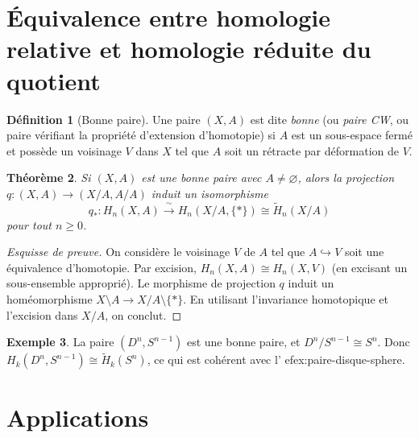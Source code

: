 \documentclass[12pt,a4paper,openany]{book}
\theoremstyle{definition}
\newtheorem{definition}{Définition}[chapter]
\newtheorem{exemple}[definition]{Exemple}
\theoremstyle{plain}
\newtheorem{theoreme}[definition]{Théorème}
\theoremstyle{remark}
\begin{document}
\section{Équivalence entre homologie relative et homologie réduite du quotient}\label{sec:equiv-relative-quotient}

\begin{definition}[Bonne paire]\label{def:bonne-paire}
Une paire $(X, A)$ est dite \emph{bonne} (ou \emph{paire CW}, ou paire vérifiant la
propriété d'extension d'homotopie) si $A$ est un sous-espace fermé et possède un
voisinage $V$ dans $X$ tel que $A$ soit un rétracte par déformation de $V$.
\end{definition}

\begin{theoreme}\label{thm:relative-quotient}
Si $(X, A)$ est une bonne paire avec $A \neq \varnothing$, alors la projection
$q \colon (X, A) \to (X/A, A/A)$ induit un isomorphisme
\[
  q_* \colon H_n(X, A) \xrightarrow{\;\sim\;} H_n(X/A, \{*\}) \cong \widetilde{H}_n(X/A)
\]
pour tout $n \geq 0$.
\end{theoreme}

\begin{proof}[Esquisse de preuve]
On considère le voisinage $V$ de $A$ tel que $A \hookrightarrow V$ soit une équivalence d'homotopie.
Par excision, $H_n(X, A) \cong H_n(X, V)$ (en excisant un sous-ensemble approprié).
Le morphisme de projection $q$ induit un homéomorphisme $X \setminus A \to X/A \setminus \{*\}$.
En utilisant l'invariance homotopique et l'excision dans $X/A$, on conclut.
\end{proof}

\begin{exemple}\label{ex:quotient-sn}
La paire $(D^n, S^{n-1})$ est une bonne paire, et $D^n/S^{n-1} \cong S^n$.
Donc $H_k(D^n, S^{n-1}) \cong \widetilde{H}_k(S^n)$, ce qui est cohérent avec
l'
ef{ex:paire-disque-sphere}.
\end{exemple}

\section{Applications}\label{sec:applications-excision}
\end{document}
